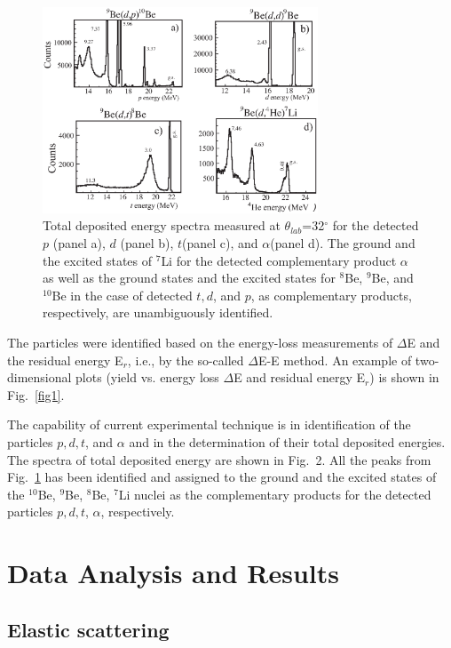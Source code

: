 \documentclass[10pt]{iopart}
\begin{document}
\begin{figure}[tp]
 \includegraphics[width=8.2cm]{d_Etot_Fig2.eps}
\caption{Total deposited energy spectra measured at $\theta_{lab}$=32$^\circ$ for the detected $p$ (panel a), $d$ (panel b), $t$(panel c), and $\alpha$(panel d). The ground and the excited states of ${}^7$Li for the detected complementary product $\alpha$ as well as the ground states and the excited states for ${}^8$Be, ${}^9$Be, and ${}^{10}$Be in the case of detected $t, d$, and $p$, as complementary products, respectively, are unambiguously identified.}
\label{fig2}
\end{figure}	

The particles were identified based on the energy-loss measurements of $\Delta$E and the residual energy E$_r$, i.e., by the so-called $\Delta$E-E method. An example of two-dimensional plots (yield vs. energy loss $\Delta$E and residual energy E$_r$) is shown in Fig.~\ref{fig1}.

The capability of current experimental technique is in identification of the particles $p, d, t$, and $\alpha$ and in the determination of their total deposited energies. The spectra of total deposited energy are shown in Fig.~2. All the peaks from Fig.~\ref{fig2} has been identified and assigned to the ground and the excited states of the ${}^{10}$Be, ${}^9$Be, ${}^8$Be, ${}^7$Li nuclei as the complementary products for the detected particles $p, d, t$, $\alpha$, respectively.

\section{Data Analysis and Results }
\subsection{Elastic scattering}
\end{document}
